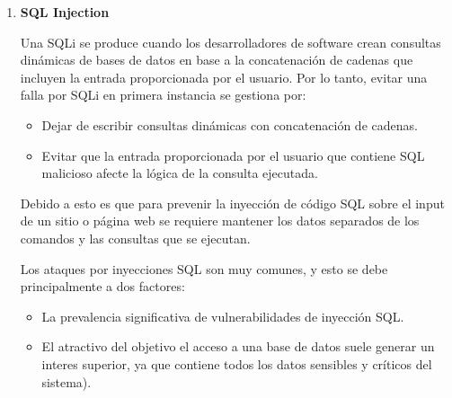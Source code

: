 \documentclass[12pt,oneside,a4paper]{book}
\begin{document}
\begin{enumerate}
    \begin{enumerate}
        \item{\textbf{SQL Injection}}

        \vspace{1em}

        \hspace{20pt}
        Una SQLi se produce cuando los desarrolladores de software crean consultas dinámicas de bases de datos en base a la concatenación de cadenas que incluyen la entrada proporcionada por el usuario. Por lo tanto, evitar una falla por SQLi en primera instancia se gestiona por: 

        \vspace{1em}
        
        \begin{itemize}
            \item Dejar de escribir consultas dinámicas con concatenación de cadenas.
            \item Evitar que la entrada proporcionada por el usuario que contiene SQL malicioso afecte la lógica de la consulta ejecutada.
        \end{itemize}

        Debido a esto es que para prevenir la inyección de código SQL sobre el input de un sitio o página web se requiere mantener los datos separados de los comandos y las consultas que se ejecutan.

        \vspace{1em}

        \hspace{20pt}
        Los ataques por inyecciones SQL son muy comunes, y esto se debe principalmente a dos factores:

        \vspace{1em}
        
        \begin{itemize}
            \item La prevalencia significativa de vulnerabilidades de inyección SQL.
            \item El atractivo del objetivo el acceso a una base de datos suele generar un interes superior, ya que contiene todos los datos sensibles y críticos del sistema).
        \end{itemize}

        \vspace{1em}
        

\end{enumerate}
\end{enumerate}
\end{document}
